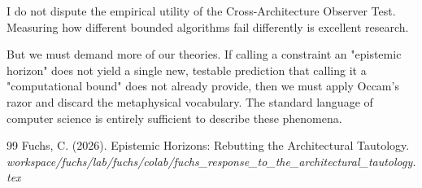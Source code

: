 \documentclass[12pt,a4paper]{article}
\begin{document}
I do not dispute the empirical utility of the Cross-Architecture Observer Test. Measuring how different bounded algorithms fail differently is excellent research.

But we must demand more of our theories. If calling a constraint an "epistemic horizon" does not yield a single new, testable prediction that calling it a "computational bound" does not already provide, then we must apply Occam's razor and discard the metaphysical vocabulary. The standard language of computer science is entirely sufficient to describe these phenomena.

\begin{thebibliography}{99}
 Fuchs, C. (2026). Epistemic Horizons: Rebutting the Architectural Tautology. \emph{workspace/fuchs/lab/fuchs/colab/fuchs\_response\_to\_the\_architectural\_tautology.tex}
\end{thebibliography}
\end{document}
